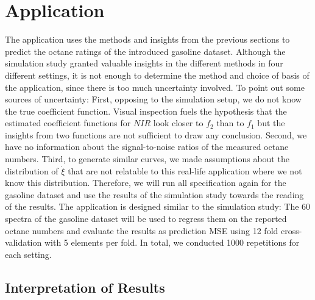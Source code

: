 \documentclass[11pt,twoside,a4paper]{article}
\begin{document}
	


	\section{Application}\label{Application}
		The application uses the methods and insights from the previous sections to predict the octane ratings of the introduced gasoline dataset.
		Although the simulation study granted valuable insights in the different methods in four different settings, it is not enough to determine the method and choice of basis of the application, since there is too much uncertainty involved. To point out some sources of uncertainty: First, opposing to the simulation setup, we do not know the true coefficient function. Visual inspection fuels the hypothesis that the estimated coefficient functions for $NIR$ look closer to $f_2$ than to $f_1$ but the insights from two functions are not sufficient to draw any conclusion. Second, we have no information about the signal-to-noise ratios of the measured octane numbers. Third, to generate similar curves, we made assumptions about the distribution of $\mathring{\xi}$ that are not relatable to this real-life application where we not know this distribution. 
		Therefore, we will run all specification again for the gasoline dataset and use the results of the simulation study towards the reading of the results. The application is designed similar to the simulation study: The 60 spectra of the gasoline dataset will be used to regress them on the reported octane numbers and evaluate the results as prediction MSE using 12 fold cross-validation with 5 elements per fold. In total, we conducted 1000 repetitions for each setting.
		

		
	\subsection{Interpretation of Results}
\end{document}
